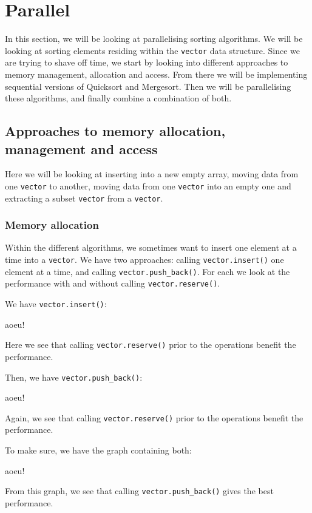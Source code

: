 \section{Parallel}
In this section, we will be looking at parallelising sorting algorithms. We
will be looking at sorting elements residing within the \texttt{vector} data
structure. Since we are trying to shave off time, we start by looking into
different approaches to memory management, allocation and access. From there we
will be implementing sequential versions of Quicksort and Mergesort. Then we
will be parallelising these algorithms, and finally combine a combination of
both.

\subsection{Approaches to memory allocation, management and access}
Here we will be looking at inserting into a new empty array, moving data from
one \texttt{vector} to another, moving data from one \texttt{vector} into an
empty one and extracting a subset \texttt{vector} from a \texttt{vector}.

\subsubsection{Memory allocation}
Within the different algorithms, we sometimes want to insert one element at a
time into a \texttt{vector}. We have two approaches: calling \texttt{vector.insert()}
one element at a time, and calling \texttt{vector.push\_back()}. For each we look at
the performance with and without calling \texttt{vector.reserve()}.

We have \texttt{vector.insert()}:
\begin{center}
aoeu!
\end{center}
Here we see that calling \texttt{vector.reserve()} prior to the operations benefit the
performance.

Then, we have \texttt{vector.push\_back()}:
\begin{center}
aoeu!
\end{center}
Again, we see that calling \texttt{vector.reserve()} prior to the operations benefit the
performance.

To make sure, we have the graph containing both:
\begin{center}
aoeu!
\end{center}
From this graph, we see that calling \texttt{vector.push\_back()} gives the
best performance.

